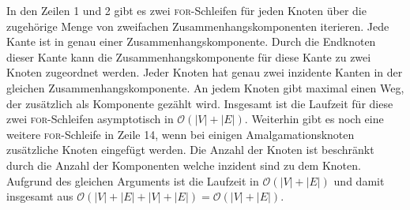 \begin{bem}
\begin{itemize}
In den Zeilen 1 und 2 gibt es zwei \textsc{for}-Schleifen für jeden Knoten über die zugehörige Menge von zweifachen Zusammenhangskomponenten iterieren. Jede Kante ist in genau einer Zusammenhangskomponente. Durch die Endknoten dieser Kante kann die Zusammenhangskomponente für diese Kante zu zwei Knoten zugeordnet werden. Jeder Knoten hat genau zwei inzidente Kanten in der gleichen Zusammenhangskomponente. An jedem Knoten gibt maximal einen Weg, der zusätzlich als Komponente gezählt wird. Insgesamt ist die Laufzeit für diese zwei \textsc{for}-Schleifen asymptotisch in $\mathcal{O}(|V|+|E|)$. Weiterhin gibt es noch eine weitere \textsc{for}-Schleife in Zeile 14, wenn bei einigen Amalgamationsknoten zusätzliche Knoten eingefügt werden. Die Anzahl der Knoten ist beschränkt durch die Anzahl der Komponenten welche inzident sind zu dem Knoten. Aufgrund des gleichen Arguments ist die Laufzeit in $\mathcal{O}(|V|+|E|)$ und damit insgesamt aus $\mathcal{O}(|V|+|E|+|V|+|E|)=\mathcal{O}(|V|+|E|)$.
\end{itemize}
\end{bem}
